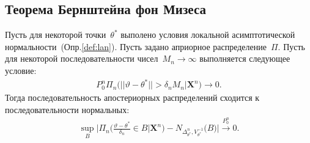 \documentclass[../main.tex]{subfiles}
\begin{document}
\subsection{Теорема Бернштейна фон Мизеса}
\begin{theorem}
Пусть для некоторой точки~$\theta^*$ выполено условия локальной асимптотической нормальности~(Опр.\ref{def:lan}).  Пусть задано априорное распределение~$\Pi$. Пусть для некоторой последовательности чисел~$M_n \to \infty$ выполняется следующее условие:
\[
\label{th:1}
\begin{aligned}
P_0^{n}\Pi_n\bigr(||\vartheta-\theta^*||>\delta_nM_n|\textbf{X}^n\bigr) \to 0.
\end{aligned}
\]
Тогда последовательность апостериорных распределений сходится к последовательности нормальных:
\[
\begin{aligned}
\sup_{B}\bigr|\Pi_{n}\bigr(\frac{\vartheta-\theta^*}{\delta_n}\in B|\textbf{X}^n\bigr)  - N_{\Delta^n_{\theta^*}, V^{-1}_{\theta^*}}\bigr(B\bigr)\bigr|  \overset{P_0^{n}}{\to} 0.
\end{aligned}
\]
\end{theorem}
\end{document}
